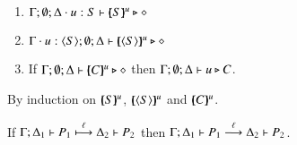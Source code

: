


\begin{proposition}\rm
\label{pro:characteristic}
\begin{enumerate}
\item $\Gamma; \emptyset; \Delta \cdot u:S \vdash [\!\!(S)\!\!]^{u} \triangleright \diamond$ 
\item $\Gamma \cdot u:\langle S \rangle; \emptyset; \Delta \vdash [\!\!(\langle S \rangle)\!\!]^{u} \triangleright \diamond$
\item 	If $\Gamma; \emptyset; \Delta \vdash [\!\!(C)\!\!]^{u} \triangleright \diamond$
	then
	$\Gamma; \emptyset; \Delta \vdash u \triangleright C$.
\end{enumerate}
\end{proposition}
\begin{IEEEproof}
	By induction on $[\!\!(S)\!\!]^{u}$, $[\!\!(\langle S \rangle)\!\!]^{u}$
and $[\!\!(C)\!\!]^{u}$. 
\end{IEEEproof}


\begin{lemma}[Invariant]\label{l:invariant}
	If $\Gamma; \Delta_1 \vdash P_1 \stackrel{\ell}{\longmapsto} \Delta_2 \vdash P_2$
	then $\Gamma; \Delta_1 \vdash P_1 \stackrel{\ell}{\longrightarrow} \Delta_2 \vdash P_2$.
\end{lemma}

